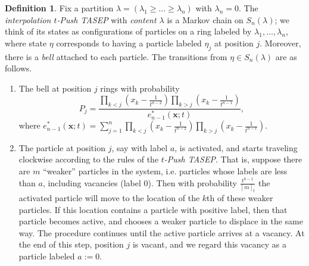 \documentclass[12pt]{amsart}
\theoremstyle{definition}
\newtheorem{definition}[thm]{Definition}
\newcommand{\bfx}{\boldsymbol{x}}
\def\LW#1{(\textcolor{teal}{LW:#1})}
\begin{document}
\begin{definition}%
\label{def:intpushTASEP}
Fix a partition $\lambda=(\lambda_1 \geq \dots \geq \lambda_n)$ with $\lambda_n=0$.
The \emph{interpolation $t$-Push TASEP} with 
\emph{content $\lambda$} is a Markov chain
on $S_n(\lambda)$; we think of its states as configurations of particles on a ring labeled by $\lambda_1,\dots, \lambda_n$, where state $\eta$ corresponds to having  a particle labeled $\eta_j$ at position $j$.  Moreover, there is a \emph{bell} attached to each particle.
The transitions from $\eta\in S_n(\lambda)$ are as follows.
\begin{enumerate}[label=(Step \arabic*)]
   \item[(Step 0)]\label{Step0} The bell at position $j$ rings with probability 
   $$P_j
   =\frac{\prod_{k<j}\left(x_k-\frac{1}{t^{n-2}}\right)\prod_{k>j}\left(x_k-\frac{1}{t^{n-1}}\right)}{e^*_{n-1}(\bfx;t)}, $$
   where 
   $e^*_{n-1}(\bfx;t)=\sum_{j=1}^n\prod_{k<j}\left(x_k-\frac{1}{t^{n-2}}\right)\prod_{k>j}\left(x_k-\frac{1}{t^{n-1}}\right)$.
      \item\label{Step1}%
      The particle at position $j$, say with label $a$, is activated, and starts traveling clockwise according to the rules of the \emph{$t$-Push TASEP}.  That is, suppose  there are $m$ ``weaker'' particles in the system, i.e. particles whose labels are less than $a$,  including vacancies (label $0$).
   Then with probability $\frac{t^{k-1}}{[m]_t}$ the activated particle will move to the location of the $k$th of these weaker particles.  If this location contains a particle with positive label, then that particle becomes active, and chooses a weaker particle to displace in the same way.  The procedure continues until the active particle arrives at a vacancy.  
   At the end of this step, position $j$ is vacant, and 
   we regard this vacancy as a particle labeled $a:=0$.

   

\end{enumerate}
\end{definition}
\end{document}
